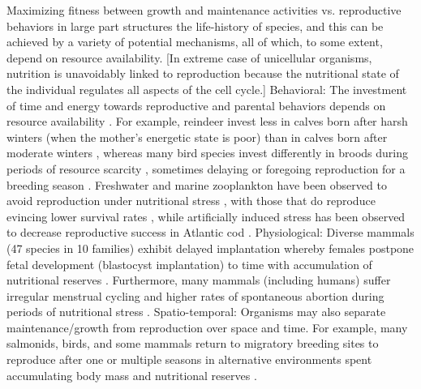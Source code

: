 \documentclass[12pt,english]{article}
\begin{document}
\begin{spacing}{1.9}
Maximizing fitness between growth and maintenance activities vs. reproductive behaviors in large part structures the life-history of species, and this can be achieved by a variety of potential mechanisms, all of which, to some extent, depend on resource availability.
[In extreme case of unicellular organisms, nutrition is unavoidably linked to reproduction because the nutritional state of the individual regulates all aspects of the cell cycle.]
Behavioral: The investment of time and energy towards reproductive and parental behaviors depends on resource availability \citep{Morris:1987eo}.
For example, reindeer invest less in calves born after harsh winters (when the mother's energetic state is poor) than in calves born after moderate winters \citep{Tveraa:2003fq}, whereas many bird species invest differently in broods during periods of resource scarcity \citep{Daan:1988va,Jacot:2009dv}, sometimes delaying or foregoing reproduction for a breeding season \citep{Barboza:2002in}.
Freshwater and marine zooplankton have been observed to avoid reproduction under nutritional stress \citep{Threlkeld:1976ih}, with those that do reproduce evincing lower survival rates \citep{Kirk:1997cc}, while artificially induced stress has been observed to decrease reproductive success in Atlantic cod \citep{Morgan:1999do}.
Physiological: Diverse mammals (47 species in 10 families) exhibit delayed implantation whereby females postpone fetal development (blastocyst implantation) to time with accumulation of nutritional reserves \citep{Mead:1989dt,Sandell:1990kw}. %
Furthermore, many mammals (including humans) suffer irregular menstrual cycling and higher rates of spontaneous abortion during periods of nutritional stress \citep{Bulik:1999eo,Trites:2003cc}.
Spatio-temporal: Organisms may also separate maintenance/growth from reproduction over space and time. 
For example, many salmonids, birds, and some mammals return to migratory breeding sites to reproduce after one or multiple seasons in alternative environments spent accumulating body mass and nutritional reserves \citep{Weber:1998jg,Mduma:1999cp,Moore:2014hi}.

\end{spacing}
\end{document}
